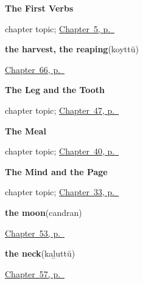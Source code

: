 \noindent\begin{minipage}[t]{\linewidth}
\raggedright
\textbf{The First Verbs}\par
\footnotesize chapter topic; \hyperref[ch:first-verbs]{Chapter~5, p.~\pageref*{ch:first-verbs}}
\end{minipage}\par\smallskip

\noindent\begin{minipage}[t]{\linewidth}
\raggedright
\textbf{the harvest, the reaping}\enspace\emph{}\enspace(koyttŭ)\par
\footnotesize \hyperref[ch:ml-out-in-the-paddy]{Chapter~66, p.~\pageref*{ch:ml-out-in-the-paddy}}
\end{minipage}\par\smallskip

\noindent\begin{minipage}[t]{\linewidth}
\raggedright
\textbf{The Leg and the Tooth}\par
\footnotesize chapter topic; \hyperref[ch:ml-body-more]{Chapter~47, p.~\pageref*{ch:ml-body-more}}
\end{minipage}\par\smallskip

\noindent\begin{minipage}[t]{\linewidth}
\raggedright
\textbf{The Meal}\par
\footnotesize chapter topic; \hyperref[ch:ml-the-meal]{Chapter~40, p.~\pageref*{ch:ml-the-meal}}
\end{minipage}\par\smallskip

\noindent\begin{minipage}[t]{\linewidth}
\raggedright
\textbf{The Mind and the Page}\par
\footnotesize chapter topic; \hyperref[ch:ml-mind-and-page]{Chapter~33, p.~\pageref*{ch:ml-mind-and-page}}
\end{minipage}\par\smallskip

\noindent\begin{minipage}[t]{\linewidth}
\raggedright
\textbf{the moon}\enspace\emph{}\enspace(candran)\par
\footnotesize \hyperref[ch:ml-overhead]{Chapter~53, p.~\pageref*{ch:ml-overhead}}
\end{minipage}\par\smallskip

\noindent\begin{minipage}[t]{\linewidth}
\raggedright
\textbf{the neck}\enspace\emph{}\enspace(kaḻuttŭ)\par
\footnotesize \hyperref[ch:ml-five-more-of-the-body]{Chapter~57, p.~\pageref*{ch:ml-five-more-of-the-body}}
\end{minipage}\par\smallskip


